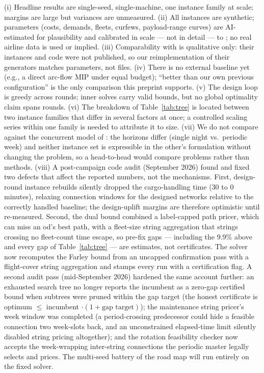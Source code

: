 \documentclass[11pt]{article}
\begin{document}
(i) Headline results are single-seed, single-machine, one instance family
at scale; margins are large but variances are unmeasured. (ii) All
instances are synthetic; parameters (costs, demands, fleets, curfews,
payload-range curves) are AI-estimated for plausibility and calibrated in
scale --- not in detail --- to \cite{derigs2013}; no real airline data is
used or implied. (iii) Comparability with \cite{derigs2013} is qualitative
only: their instances and code were not published, so our reimplementation
of their generators matches parameters, not files. (iv) There is no
external baseline yet (e.g., a direct arc-flow MIP under equal budget);
``better than our own previous configuration'' is the only comparison this
preprint supports. (v) The design loop is greedy across rounds; inner
solves carry valid bounds, but no global optimality claim spans rounds.
(vi) The breakdown of Table~\ref{tab:tree} is located between two instance
families that differ in several factors at once; a controlled scaling series
within one family is needed to attribute it to size.
(vii) We do not compare against the concurrent model of \cite{zhu2026}: the
horizons differ (single night vs.\ periodic week) and neither instance set
is expressible in the other's formulation without changing the problem, so a
head-to-head would compare problems rather than methods.
(viii) A post-campaign code audit (September 2026) found and fixed two
defects that affect the reported numbers, not the mechanisms. First,
design-round instance rebuilds silently dropped the cargo-handling time
(30 to 0 minutes), relaxing connection windows for the designed networks
relative to the correctly handled baseline; the design-uplift margins are
therefore optimistic until re-measured. Second, the dual bound combined a
label-capped path pricer, which can miss an od's best path, with a
fleet-size string aggregation that strings crossing no fleet-count time
escape, so pre-fix gaps --- including the 9.9\% above and every gap of
Table~\ref{tab:tree} --- are estimates, not certificates. The solver now
recomputes the Farley bound from an uncapped confirmation pass with a
flight-cover string aggregation and stamps every run with a certification
flag. A second audit pass (mid-September 2026) hardened the same account
further: an exhausted search tree no longer reports the incumbent as a
zero-gap certified bound when subtrees were pruned within the gap target
(the honest certificate is optimum $\le$ incumbent
$\cdot(1+\text{gap target})$); the maintenance string pricer's week window
was completed (a period-crossing predecessor could hide a feasible
connection two week-slots back, and an unconstrained elapsed-time limit
silently disabled string pricing altogether); and the rotation
feasibility checker now accepts the week-wrapping inter-string
connections the periodic master legally selects and prices. The
multi-seed battery of the road map will run entirely on the fixed
solver.
\end{document}
